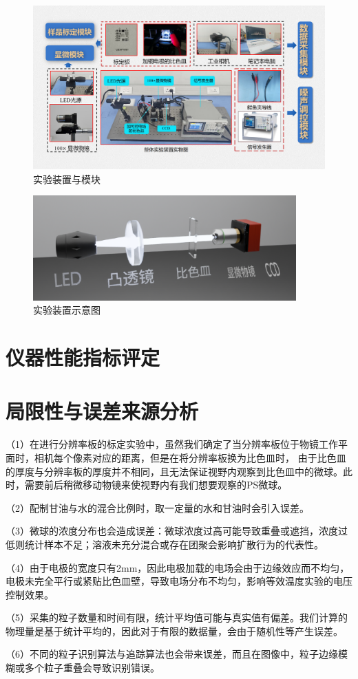 \documentclass[a4paper]{report} %
\begin{document}
\begin{figure}[H]
    \centering
    \includegraphics[width=1.0\textwidth]{实验装置模块.png}
    \caption{实验装置与模块}
    \label{fig:allsetup}
\end{figure}
\begin{figure}[H]
    \centering
    \includegraphics[width=0.9\textwidth]{实验示意图.png}
    \caption{实验装置示意图}
    \label{fig:sets}
\end{figure} 
\section{仪器性能指标评定}

\section{局限性与误差来源分析}
（1）在进行分辨率板的标定实验中，虽然我们确定了当分辨率板位于物镜工作平面时，相机每个像素对应的距离，但是在将分辨率板换为比色皿时，
由于比色皿的厚度与分辨率板的厚度并不相同，且无法保证视野内观察到比色皿中的微球。此时，需要前后稍微移动物镜来使视野内有我们想要观察的PS微球。 \par
（2）配制甘油与水的混合比例时，取一定量的水和甘油时会引入误差。\par
（3）微球的浓度分布也会造成误差：微球浓度过高可能导致重叠或遮挡，浓度过低则统计样本不足；溶液未充分混合或存在团聚会影响扩散行为的代表性。\par
（4）由于电极的宽度只有2mm，因此电极加载的电场会由于边缘效应而不均匀，电极未完全平行或紧贴比色皿壁，导致电场分布不均匀，影响等效温度实验的电压控制效果。\par
（5）采集的粒子数量和时间有限，统计平均值可能与真实值有偏差。我们计算的物理量是基于统计平均的，因此对于有限的数据量，会由于随机性等产生误差。\par
（6）不同的粒子识别算法与追踪算法也会带来误差，而且在图像中，粒子边缘模糊或多个粒子重叠会导致识别错误。\par
\end{document}
